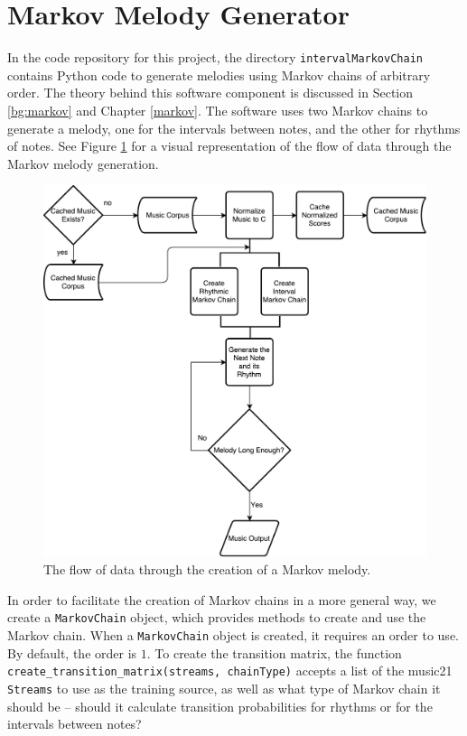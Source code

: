 \section{Markov Melody Generator} \label{software:markov}

In the code repository for this project, the directory \texttt{intervalMarkovChain} contains Python code to generate melodies using Markov chains of arbitrary order.
The theory behind this software component is discussed in Section \ref{bg:markov} and Chapter \ref{markov}.
The software uses two Markov chains to generate a melody, one for the intervals between notes, and the other for rhythms of notes.
See Figure \ref{fig:markovflowchart} for a visual representation of the flow of data through the Markov melody generation.

\begin{figure}[h!]
	\centering
	\includegraphics[width=\linewidth]{figures/markov_flowchart.pdf}
	\caption{The flow of data through the creation of a Markov melody.}
	\label{fig:markovflowchart}
\end{figure}

In order to facilitate the creation of Markov chains in a more general way, we create a \texttt{MarkovChain} object, which provides methods to create and use the Markov chain.
When a \texttt{MarkovChain} object is created, it requires an order to use.
By default, the order is $1$.
To create the transition matrix, the function \texttt{create\_transition\_matrix(streams, chainType)} accepts a list of the music21 \texttt{Streams} to use as the training source, as well as what type of Markov chain it should be -- should it calculate transition probabilities for rhythms or for the intervals between notes?


